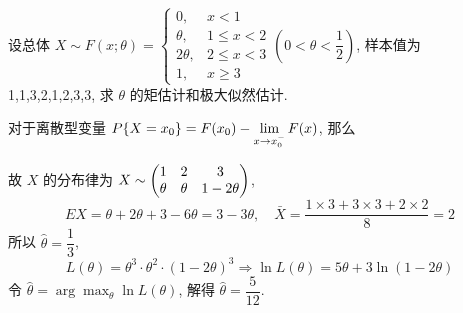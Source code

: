 \begin{example}
    设总体 $X\sim F(x;\theta)=\begin{cases}
            0, & x<1 \\ \theta, & 1\leqslant x<2 \\ 2\theta, & 2\leqslant x<3 \\ 1,&x\geqslant 3
        \end{cases}(0<\theta<\dfrac{1}{2})$, 样本值为 1,1,3,2,1,2,3,3, 求 $\theta$ 的矩估计和极大似然估计.
\end{example}
\begin{solution}
    对于离散型变量 $P\qty{X=x_0}=F(x_0)-\displaystyle \lim_{x \to x_0^-}F(x)$, 那么
    故 $X$ 的分布律为 $X\sim \mqty(1& 2& 3\\ \theta & \theta & 1-2\theta)$,
    $$
    EX=\theta+2\theta+3-6\theta=3-3\theta, \quad \bar{X}=\dfrac{1\times 3+3\times 3+2\times 2}{8}=2
    $$
    所以 $\hat{\theta}=\dfrac{1}{3}$,
    $$
    L(\theta)=\theta^3\cdot\theta^2\cdot (1-2\theta)^3\Rightarrow \ln L(\theta)=5\theta+3\ln(1-2\theta)
    $$
    令 $\displaystyle \hat{\theta}=\arg \max _{\theta} \ln L(\theta)$, 解得 $\hat{\theta}=\dfrac{5}{12}$.
\end{solution}


